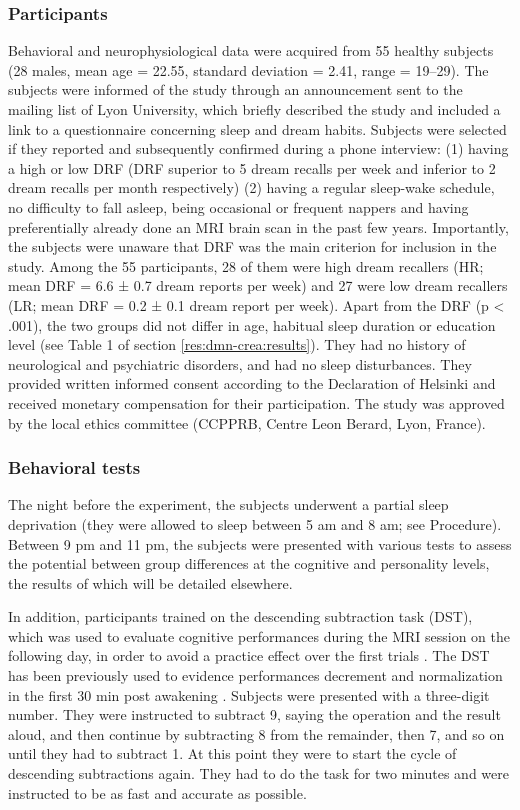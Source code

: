 \subsubsection*{Participants}
Behavioral and neurophysiological data were acquired from 55 healthy subjects (28 males, mean age = 22.55, standard deviation = 2.41, range = 19–29). The subjects were informed of the study through an announcement sent to the mailing list of Lyon University, which briefly described the study and included a link to a questionnaire concerning sleep and dream habits. Subjects were selected if they reported and subsequently confirmed during a phone interview: (1) having a high or low DRF (DRF superior to 5 dream recalls per week and inferior to 2 dream recalls per month respectively) (2) having a regular sleep-wake schedule, no difficulty to fall asleep, being occasional or frequent nappers and having preferentially already done an MRI brain scan in the past few years. Importantly, the subjects were unaware that DRF was the main criterion for inclusion in the study. Among the 55 participants, 28 of them were high dream recallers (HR; mean DRF = 6.6 ± 0.7 dream reports per week) and 27 were low dream recallers (LR; mean DRF = 0.2 ± 0.1 dream report per week). Apart from the DRF (p < .001), the two groups did not differ in age, habitual sleep duration or education level (see Table 1 of section \ref{res:dmn-crea:results}). They had no history of neurological and psychiatric disorders, and had no sleep disturbances. They provided written informed consent according to the Declaration of Helsinki and received monetary compensation for their participation. The study was approved by the local ethics committee (CCPPRB, Centre Leon Berard, Lyon, France).

\subsubsection*{Behavioral tests}
The night before the experiment, the subjects underwent a partial sleep deprivation (they were allowed to sleep between 5 am and 8 am; see Procedure). Between 9 pm and 11 pm, the subjects were presented with various tests to assess the potential between group differences at the cognitive and personality levels, the results of which will be detailed elsewhere.

In addition, participants trained on the descending subtraction task (DST), which was used to evaluate cognitive performances during the MRI session on the following day, in order to avoid a practice effect over the first trials \citep{dinges_assessing_1985}. The DST has been previously used to evidence performances decrement and normalization in the first 30 min post awakening \citep{evans_recovery_1975, dinges_assessing_1985, stampi_ultrashort_1990}. Subjects were presented with a three-digit number. They were instructed to subtract 9, saying the operation and the result aloud, and then continue by subtracting 8 from the remainder, then 7, and so on until they had to subtract 1. At this point they were to start the cycle of descending subtractions again. They had to do the task for two minutes and were instructed to be as fast and accurate as possible.

